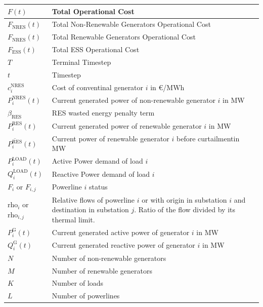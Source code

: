 \begin{center}
	\begin{tabular}{ | m{2cm} | m{10cm}| } 
		\hline
		$F(t)$ & Total Operational Cost \\ 
		\hline
		$F_\text{NRES}(t)$ & Total Non-Renewable Generators Operational Cost \\
		\hline
		$F_\text{NRES}(t)$ & Total Renewable Generators Operational Cost \\
		\hline
		$F_\text{ESS}(t)$ & Total ESS Operational Cost \\
		\hline
		$T$ & Terminal Timestep \\
		\hline
		$t$ & Timestep \\
		\hline
		$c^\text{NRES}_i$ & Cost of conventinal generator $i$ in €/MWh \\
		\hline
		$P^\text{NRES}_i(t)$ & Current generated power of non-renewable generator $i$ in MW \\
		\hline
		$\beta_\text{RES}$ & \ac{RES} wasted energy penalty term \\
		\hline
		$P^\text{RES}_i(t)$ & Current generated power of renewable generator $i$ in MW \\
		\hline
		$\overline{P^\text{RES}_i}(t)$ &  Current power of renewable generator $i$ before curtailmentin MW \\
		\hline
		$P^\text{LOAD}_i(t)$ & Active Power demand of load $i$ \\
		\hline
		$Q^\text{LOAD}_i(t)$ & Reactive Power demand of load $i$ \\
		\hline
		$F_i$ or $F_{i,j}$ & Powerline $i$ status \\
		\hline
		$\text{rho}_i$ or $\text{rho}_{i,j}$ & Relative flows of powerline $i$ or with origin in substation $i$ and destination in substation $j$. Ratio of the flow divided by its thermal limit. \\
		\hline
		$P^\text{G}_i(t)$ & Current generated active power of generator $i$ in MW \\
		\hline
		$Q^\text{G}_i(t)$ & Current generated reactive power of generator $i$ in MW \\
		\hline
		$N$ & Number of non-renewable generators \\
		\hline
		$M$ & Number of renewable generators \\
		\hline
		$K$ & Number of loads \\
		\hline
		$L$ & Number of powerlines \\
		\hline
	\end{tabular}
\end{center}

